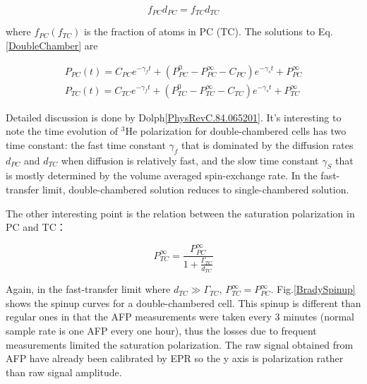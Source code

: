 \begin{equation}
f_{PC}d_{PC}=f_{TC}d_{TC}
\end{equation}

where $f_{PC} (f_{TC})$ is the fraction of atoms in PC (TC). The solutions to Eq.\ref{DoubleChamber} are

\begin{subequations}\label{DoubleChamberSolution}
	\begin{gather}
	P_{PC}(t)=C_{PC}e^{-\gamma_{f}t}+(P_{PC}^{0}-P_{PC}^{\infty}-C_{PC})e^{-\gamma_{s}t}+P_{PC}^{\infty}\\
	P_{TC}(t)=C_{TC}e^{-\gamma_{f}t}+(P_{TC}^{0}-P_{TC}^{\infty}-C_{TC})e^{-\gamma_{s}t}+P_{TC}^{\infty}
	\end{gather}
\end{subequations}

Detailed discussion is done by Dolph\ref{PhysRevC.84.065201}. It's interesting to note the time evolution of $^{3}$He polarization for double-chambered cells has two time constant: the fast time constant $\gamma_{f}$ that is dominated by the diffusion rates $d_{PC}$ and $d_{TC}$ when diffusion is relatively fast, and the slow time constant $\gamma_{S}$ that is mostly determined by the volume averaged spin-exchange rate. In the fast-transfer limit, double-chambered solution reduces to single-chambered solution. 

The other interesting point is the relation between the saturation polarization in PC and TC：

\begin{equation}
P_{TC}^{\infty}=\frac{P_{PC}^{\infty}}{1+\frac{\Gamma_{TC}}{d_{TC}}}
\end{equation}

Again, in the fast-transfer limit where $d_{TC}\gg \Gamma_{TC}$, $P_{TC}^{\infty}=P_{PC}^{\infty}$. Fig.\ref{BradySpinup} shows the spinup curves for a double-chambered cell. This spinup is different than regular ones in that the AFP measurements were taken every 3 minutes (normal sample rate is one AFP every one hour), thus the losses due to frequent measurements limited the saturation polarization. The raw signal obtained from AFP have already been calibrated by EPR so the y axis is polarization rather than raw signal amplitude. 


